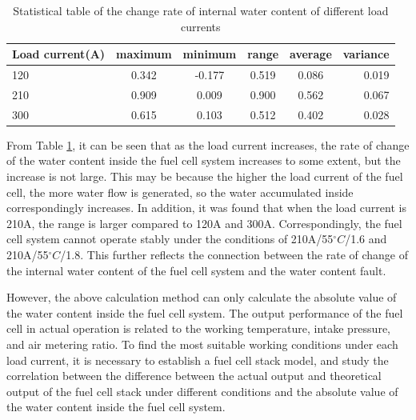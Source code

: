\begin{table}
	\centering
	\begin{center}
		\caption{Statistical table of the change rate of internal water content of different load currents}
		\label{tab:StatisticalTable}
		\begin{tabular}{l|c|c|c|c|r}
			\hline
			\textbf{Load current(A)} & \textbf{maximum} & \textbf{minimum} & \textbf{range} & \textbf{average} & \textbf{variance} \\
			\hline
			120                       & 0.342            & -0.177           & 0.519          & 0.086            & 0.019             \\
			210                       & 0.909            & 0.009            & 0.900          & 0.562            & 0.067             \\
			300                       & 0.615            & 0.103            & 0.512          & 0.402            & 0.028             \\
			\hline
		\end{tabular}
	\end{center}
\end{table}
From Table \ref{tab:StatisticalTable}, it can be seen that as the load current increases, the rate of change of the water content inside the fuel cell system increases to some extent, but the increase is not large. This may be because the higher the load current of the fuel cell, the more water flow is generated, so the water accumulated inside correspondingly increases. In addition, it was found that when the load current is 210A, the range is larger compared to 120A and 300A. Correspondingly, the fuel cell system cannot operate stably under the conditions of 210A/55$^{\circ}C$/1.6 and 210A/55$^{\circ}C$/1.8. This further reflects the connection between the rate of change of the internal water content of the fuel cell system and the water content fault.
\par
However, the above calculation method can only calculate the absolute value of the water content inside the fuel cell system. The output performance of the fuel cell in actual operation is related to the working temperature, intake pressure, and air metering ratio. To find the most suitable working conditions under each load current, it is necessary to establish a fuel cell stack model, and study the correlation between the difference between the actual output and theoretical output of the fuel cell stack under different conditions and the absolute value of the water content inside the fuel cell system.
